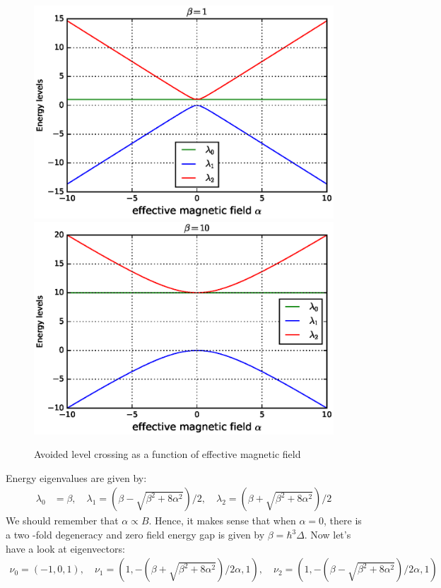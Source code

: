 \documentclass[11pt,a4paper]{article}
\begin{document}
\begin{figure}[!ht]
\begin{center}
\includegraphics[scale=0.5]{pics/energy_level_beta1.eps} 
\includegraphics[scale=0.5]{pics/energy_level_beta10.eps} 
\caption{Avoided level crossing as a function of effective magnetic field }
\label{ev}
\end{center}
\end{figure}

 Energy eigenvalues are given by:
\begin{align*}
\lambda_0 &= \beta, \quad \lambda_1 = (\beta - \sqrt{\beta^2 + 8 \alpha^2})/2 , \quad  \lambda_2 = (\beta + \sqrt{\beta^2 + 8 \alpha^2})/2
\end{align*}
We should remember that $\alpha \propto B$. Hence, it makes sense that when $\alpha=0$,  there is a two -fold degeneracy and zero field energy gap is given by $\beta=\hbar^3 \Delta$. Now let's have a look at eigenvectors:
\begin{align*}
\nu_0 = (-1,0,1), \quad \nu_1 = (1, -(\beta + \sqrt{\beta^2 + 8 \alpha^2})/2 \alpha, 1) , \quad \nu_2 = (1, -(\beta - \sqrt{\beta^2 + 8 \alpha^2})/2 \alpha, 1)
\end{align*}
\end{document}

